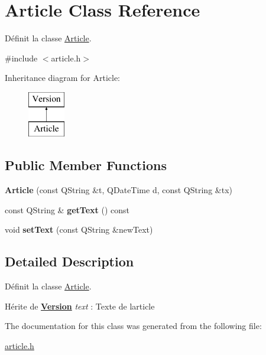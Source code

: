\hypertarget{class_article}{}\section{Article Class Reference}
\label{class_article}


Définit la classe \hyperlink{class_article}{Article}.  




{\ttfamily \#include $<$article.\+h$>$}

Inheritance diagram for Article\+:\begin{figure}[H]
\begin{center}
\leavevmode
\includegraphics[height=2.000000cm]{class_article}
\end{center}
\end{figure}
\subsection*{Public Member Functions}
\begin{DoxyCompactItemize}
\item 
\mbox{\label{class_article_aeeebcc77729439ee87c940b56524f419}} 
{\bfseries Article} (const Q\+String \&t, Q\+Date\+Time d, const Q\+String \&tx)
\item 
\mbox{\label{class_article_a235fb07dfa8507b171c35624ada564d7}} 
const Q\+String \& {\bfseries get\+Text} () const
\item 
\mbox{\label{class_article_a6e5e9fa68313373dc0d30de3e45cd195}} 
void {\bfseries set\+Text} (const Q\+String \&new\+Text)
\end{DoxyCompactItemize}


\subsection{Detailed Description}
Définit la classe \hyperlink{class_article}{Article}. 

Hérite de {\bfseries \hyperlink{class_version}{Version}} {\itshape text} \+: Texte de l\textquotesingle{}article 

The documentation for this class was generated from the following file\+:\begin{DoxyCompactItemize}
\item 
\hyperlink{article_8h}{article.\+h}\end{DoxyCompactItemize}
